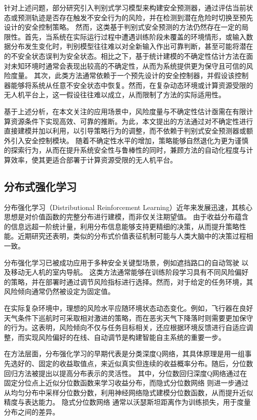 针对上述问题，部分研究引入判别式学习模型来构建安全预测器\cite{ma2020discriminative}，通过评估当前状态或预测轨迹是否存在触发不安全行为的风险，并在检测到潜在危险时切换至预先设计的安全控制策略。
然而，这类基于判别式安全预测的方法仍然存在一定的局限性。首先，当系统在实际运行过程中遭遇训练阶段未覆盖的环境情形，或输入数据分布发生变化时，判别模型往往难以对全新输入作出可靠判断，甚至可能将潜在的不安全状态误判为安全状态。相比之下，基于统计建模的不确定性估计方法在面对未知环境时通常会表现出较高的不确定性，从而为系统提供更为保守且可信的风险度量。
其次，此类方法通常依赖于一个预先设计的安全控制器，并假设该控制器能够将系统从任意不安全状态中恢复。然而，在复杂动态环境或计算资源受限的无人机平台上，这一假设往往难以成立，从而限制了方法的实际适用性。

基于上述分析，在本文关注的应用场景中，风险度量与不确定性估计亟需在有限计算资源条件下实现高效、可靠的推断。为此，本文提出的方法通过对不确定性进行直接建模并加以利用，以引导策略行为的调整，而不依赖于判别式安全预测器或额外引入安全控制模块。
随着不确定性水平的增加，策略能够自然退化为更为谨慎的探索行为，从而在提升系统安全性与鲁棒性的同时，兼顾方法的自动化程度与计算效率，使其更适合部署于计算资源受限的无人机平台。

\subsection{分布式强化学习}

分布强化学习（Distributional Reinforcement Learning）近年来发展迅速，其核心思想是对价值函数的完整分布进行建模，而非仅关注期望值\cite{ma2025dsac,lowet2025opponent}。
由于收益分布蕴含的信息远超一阶统计量，利用分布信息能够支持更精细的决策，从而提升策略性能。近期研究还表明，类似的分布式价值表征机制可能与人类大脑中的决策过程相一致\cite{dabney2020distributional}。

分布强化学习已被成功应用于多种安全关键型场景，例如遮挡路口的自动驾驶\cite{liu2024attention} 以及移动无人机的室内导航\cite{wang2025adaptive}。
这类方法通常能够在训练阶段学习具有不同风险偏好的策略，并在部署时通过调节风险指标进行选择。然而，对于给定的任务环境，其风险倾向通常仍然被设定为固定值。

在实际复杂环境中，理想的风险水平应随环境状态动态变化。例如，飞行器在良好天气条件下巡航时可采取相对激进的策略，而在恶劣天气下降落时则需要更加保守的行为。这表明，风险倾向不仅与任务目标相关，还应根据环境反馈进行自适应调整，而实现风险偏好的在线、自动调节是构建智能自主系统的重要一步。

在方法层面，分布强化学习的早期代表是分类深度Q网络\cite{bellemare2023distributional}，其具体原理是用一组事先选好的、固定的收益取值点，来近似真实但连续的收益概率分布。随后，分位数回归方法被提出以提高分布表示的灵活性\cite{zhou2020non}。
其中，分位数回归深度Q网络\cite{zhou2020non}通过在固定分位点上近似分位数函数来学习收益分布，而隐式分位数网络\cite{dabney2018implicit}  则进一步通过从均匀分布中采样分位数分数，利用神经网络隐式建模分位数函数，从而提升近似精度与表达能力。
隐式分位数网络 通常以沃瑟斯坦距离作为训练损失，用于度量分布之间的差异。

